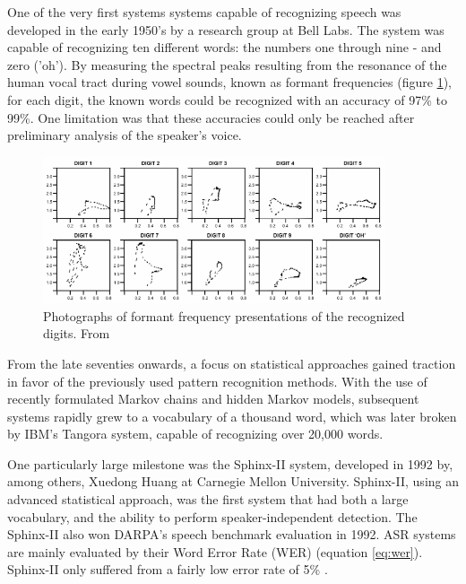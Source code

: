 \documentclass[twoside]{uva-inf-bachelor-thesis}
\begin{document}
One of the very first systems systems capable of recognizing speech was developed in the early 1950's by a research group at Bell Labs. The system was capable of recognizing ten different words: the numbers one through nine - and zero ('oh'). By measuring the spectral peaks resulting from the resonance of the human vocal tract during vowel sounds, known as formant frequencies (figure \ref{fig:ff}), for each digit, the known words could be recognized with an accuracy of 97\% to 99\%. One limitation was that these accuracies could only be reached after preliminary analysis of the speaker's voice. \cite{davis1952automatic, Juang05}

\begin{figure}[h]
    \centering
    \includegraphics[width=0.9\textwidth]{images/formantFrequencies.png}
    \caption{Photographs of formant frequency presentations of the recognized digits. From \cite{davis1952automatic}}
    \label{fig:ff}
\end{figure}


From the late seventies onwards, a focus on statistical approaches gained traction in favor of the previously used pattern recognition methods. With the use of recently formulated Markov chains and hidden Markov models, subsequent systems rapidly grew to a vocabulary of a thousand word, which was later broken by IBM's Tangora system, capable of recognizing over 20,000 words. \cite{Juang05}

One particularly large milestone was the Sphinx-II system, developed in 1992 by, among others, Xuedong Huang at Carnegie Mellon University. Sphinx-II, using an advanced statistical approach, was the first system that had both a large vocabulary, and the ability to perform speaker-independent detection. The Sphinx-II also won DARPA's speech benchmark evaluation in 1992. ASR systems are mainly evaluated by their Word Error Rate (WER) (equation \ref{eq:wer}). Sphinx-II only suffered from a fairly low error rate of 5\% \cite{huang1993overview, huang2014historical}.
\end{document}
